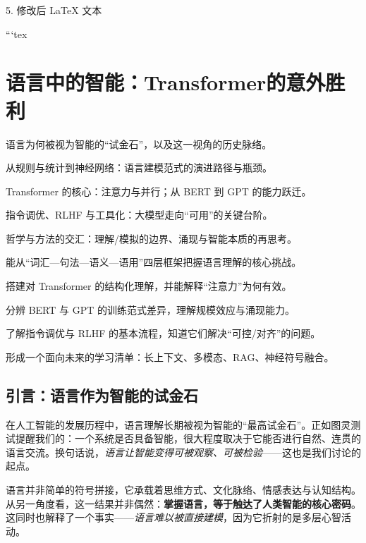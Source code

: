 
5. 修改后 LaTeX 文本

```tex

\chapter{语言中的智能：Transformer的意外胜利}

\begin{introduction}
  \item 语言为何被视为智能的“试金石”，以及这一视角的历史脉络。
  \item 从规则与统计到神经网络：语言建模范式的演进路径与瓶颈。
  \item Transformer 的核心：注意力与并行；从 BERT 到 GPT 的能力跃迁。
  \item 指令调优、RLHF 与工具化：大模型走向“可用”的关键台阶。
  \item 哲学与方法的交汇：理解/模拟的边界、涌现与智能本质的再思考。
\end{introduction}

\begin{introduction}
  \item 能从“词汇—句法—语义—语用”四层框架把握语言理解的核心挑战。
  \item 搭建对 Transformer 的结构化理解，并能解释“注意力”为何有效。
  \item 分辨 BERT 与 GPT 的训练范式差异，理解规模效应与涌现能力。
  \item 了解指令调优与 RLHF 的基本流程，知道它们解决“可控/对齐”的问题。
  \item 形成一个面向未来的学习清单：长上下文、多模态、RAG、神经符号融合。
\end{introduction}

\section{引言：语言作为智能的试金石}

在人工智能的发展历程中，语言理解长期被视为智能的“最高试金石”。正如图灵测试提醒我们的：一个系统是否具备智能，很大程度取决于它能否进行自然、连贯的语言交流。换句话说，\emph{语言让智能变得可被观察、可被检验}——这也是我们讨论的起点。

语言并非简单的符号拼接，它承载着思维方式、文化脉络、情感表达与认知结构。从另一角度看，这一结果并非偶然：\textbf{掌握语言，等于触达了人类智能的核心密码}。这同时也解释了一个事实——\emph{语言难以被直接建模}，因为它折射的是多层心智活动。

